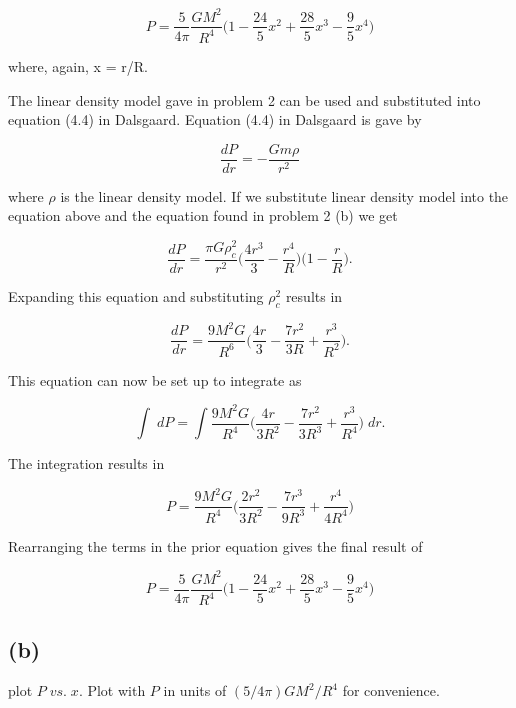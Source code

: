 \documentclass[11pt]{article}
\begin{document}
$$
P = \frac{5}{4\pi} \frac{GM^{2}}{R^{4}} \Bigg(1 - \frac{24}{5}x^{2} + \frac{28}{5}x^{3} - \frac{9}{5}x^{4}\Bigg)
$$

where, again, x = r/R.

The linear density model gave in problem 2 can be used and substituted into equation (4.4) in Dalsgaard. Equation (4.4) in Dalsgaard is gave by 

$$
\frac{dP}{dr} = -\frac{Gm\rho}{r^{2}} $$

where $\rho$ is the linear density model. If we substitute linear density model into the equation above and the equation found in problem 2 (b) we get 

$$
\frac{dP}{dr} = \frac{\pi G \rho_{c}^{2}}{r^{2}}  \Bigg(\frac{4r^{3}}{3} - \frac{r^{4}}{R}\Bigg)\Bigg( 1 - \frac{r}{R} \Bigg).
$$

Expanding this equation and substituting $\rho_{c}^{2}$ results in

$$
\frac{dP}{dr} = \frac{9 M^2 G}{R^{6}} \Bigg(\frac{4r}{3} - \frac{7r^{2}}{3R} + \frac{r^{3}}{R^{2}} \Bigg).
$$

This equation can now be set up to integrate as 

$$
\int \; dP = \int \frac{9 M^2 G}{R^{4}} \Bigg(\frac{4r}{3R^{2}} - \frac{7r^{2}}{3R^{3}} + \frac{r^{3}}{R^{4}} \Bigg) \; dr.
$$

The integration results in 

$$
P = \frac{9 M^2 G}{R^{4}} \Bigg(\frac{2r^{2}}{3R^{2}} - \frac{7r^{3}}{9R^{3}} + \frac{r^{4}}{4R^{4}} \Bigg)
$$

Rearranging the terms in the prior equation gives the final result of

$$
P = \frac{5}{4\pi} \frac{GM^{2}}{R^{4}} \Bigg(1 - \frac{24}{5}x^{2} + \frac{28}{5}x^{3} - \frac{9}{5}x^{4}\Bigg)
$$

\subsection*{(b)}

plot $P \; vs. \; x$. Plot with $P$ in units of $(5/4\pi) GM^{2}/R^{4}$ for convenience. 
\end{document}
